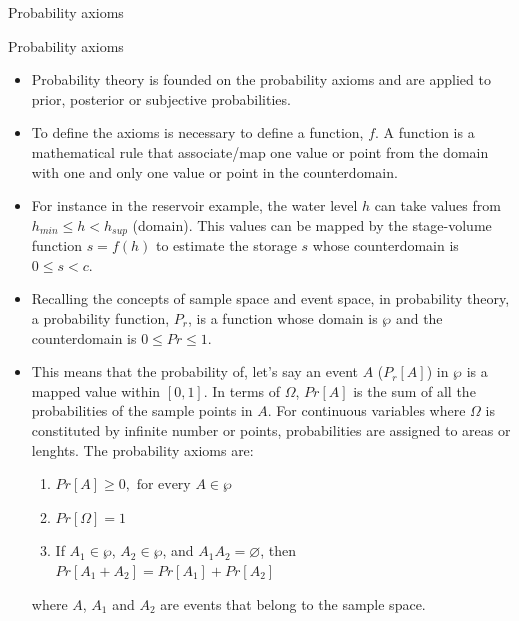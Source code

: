 \documentclass[8pt]{beamer}
\renewcommand{\emph}[1]{\textcolor{myorange}{#1}}
\begin{document}
\begin{frame}{Probability axioms}
    \begin{block}{Probability axioms}
        \begin{itemize}
            \item Probability theory is founded on the \emph{probability axioms} and are applied to prior, posterior or subjective probabilities. 
            \item To define the axioms is necessary to define a \emph{function}, $f$. A function is a mathematical rule that associate/map one value or point from the \emph{domain} with one and only one value or point in the \emph{counterdomain}.  
            \item For instance in the reservoir example, the water level $h$ can take values from $h_{min} \leq h < h_{sup}$ (domain). This values can be mapped by the stage-volume function $s = f(h)$ to estimate the storage $s$ whose counterdomain is $0 \leq s < c$. 
            \item Recalling the concepts of \emph{sample space} and \emph{event space}, in probability theory, a \emph{probability function}, $P_r$, is a function whose domain is $\wp$ and the counterdomain is $0 \leq Pr \leq 1$. 
            \item This means that the probability of, let's say an event $A$ ($P_r [A]$) in $\wp$ is a mapped value within $[0,1]$. In terms of $\Omega$, $Pr[A]$ is the sum of all the probabilities of the sample points in $A$. For continuous variables where $\Omega$ is constituted by infinite number or points, probabilities are assigned to areas or lenghts. The \alert{probability axioms} are:
        \begin{enumerate}
            \item $Pr[A] \geq 0, \text{ for every } A \in \wp$
            \item $Pr[\Omega] = 1$
            \item If $A_1 \in \wp$, $A_2 \in \wp$, and $A_1 A_2 = \varnothing$, then $Pr [A_1 + A_2] = Pr[A_1] + Pr[A_2]$ 
        \end{enumerate}
        where $A$, $A_1$ and $A_2$ are events that belong to the sample space.  
        \end{itemize}
    \end{block}
\end{frame}
\end{document}
